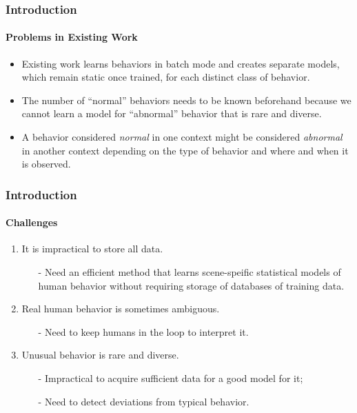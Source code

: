 
\begin{frame}
    \frametitle{Introduction}
    \framesubtitle{Problems in Existing Work}

    \begin{itemize}
        \item Existing work learns behaviors in batch mode and creates 
            separate models, which remain static once trained, for each 
            distinct class of behavior.
        \item The number of ``normal'' behaviors needs to be known 
            beforehand because we cannot learn a model for ``abnormal'' 
            behavior that is rare and diverse.
        \item A behavior considered {\em normal} in one context might be 
            considered {\em abnormal} in another context depending on the type 
            of behavior and where and when it is observed.
    \end{itemize}

\end{frame}


\begin{frame}
    \frametitle{Introduction}
    \framesubtitle{Challenges}

    \begin{enumerate}
        \item It is impractical to store all data.
            \begin{itemize}
                \item[-] Need an efficient method that learns scene-speific 
                    statistical models of human behavior \alert{without} 
                    requiring storage of databases of training data.
             \end{itemize}
        \item Real human behavior is sometimes ambiguous. 
            \begin{itemize}
                \item[-] Need to keep humans in the loop to interpret it.
            \end{itemize}
        \item Unusual behavior is rare and diverse. 
            \begin{itemize}
                \item[-] Impractical to acquire sufficient data 
                    for a good model for it; 
                \item[-] Need to detect deviations from typical behavior.
            \end{itemize}
    \end{enumerate}
  
\end{frame}

